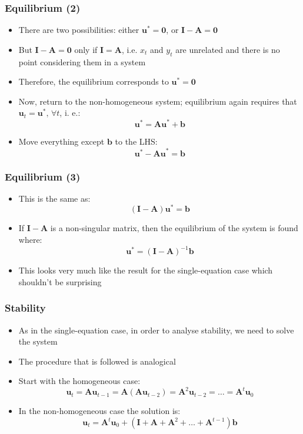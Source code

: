 \documentclass[10pt,usenames,dvipsnames]{beamer}
\theoremstyle{definition}
\begin{document}
\begin{frame}[fragile]
\frametitle{Equilibrium (2)}
\begin{itemize}
	\item There are two possibilities: either $\mathbf{u}^{*} = \mathbf{0}$, or $\mathbf{I-A} = \mathbf{0}$
	\item But $\mathbf{I-A} = \mathbf{0}$ only if $\mathbf{I} = \mathbf{A}$, i.e. $x_{t}$ and $y_{t}$ are unrelated and there is no point considering them in a system
	\item Therefore, the equilibrium corresponds to  $\mathbf{u}^{*} = \mathbf{0}$
	\item Now, return to the non-homogeneous system; equilibrium again requires that $\mathbf{u}_{t} = \mathbf{u}^{*},\, \forall t$, i. e.:
	\[
		\mathbf{u}^{*} = \mathbf{Au}^{*} + \mathbf{b}
	\]
	\item Move everything except $\mathbf{b}$ to the LHS:
	\[
		\mathbf{u}^{*} - \mathbf{Au}^{*} = \mathbf{b}
	\]
\end{itemize}
\end{frame}

\begin{frame}[fragile]
\frametitle{Equilibrium (3)}
\begin{itemize}
	\item This is the same as:
	\[
		(\mathbf{I-A})\mathbf{u}^{*} = \mathbf{b}
	\]
	\item If $\mathbf{I-A}$ is a non-singular matrix, then the equilibrium of the system is found where:
	\[
		\mathbf{u}^{*} = (\mathbf{I-A})^{-1}\mathbf{b}
	\]
	\item This looks very much like the result for the single-equation case which shouldn't be surprising
\end{itemize}
\end{frame}

\begin{frame}[fragile]
\frametitle{Stability}
\begin{itemize}
	\item As in the single-equation case, in order to analyse stability, we need to solve the system
	\item The procedure that is followed is analogical
	\item Start with the homogeneous case:
	\[
		\mathbf{u}_{t} = \mathbf{Au}_{t-1} = \mathbf{A}(\mathbf{Au}_{t-2}) = \mathbf{A}^{2}\mathbf{u}_{t-2} = \ldots = \mathbf{A}^{t}\mathbf{u}_{0}
	\]
	\item In the non-homogeneous case the solution is:
	\[
		\mathbf{u}_{t} = \mathbf{A}^{t}\mathbf{u}_{0} + (\mathbf{I + A} + \mathbf{A}^{2} + \ldots + \mathbf{A}^{t-1})\mathbf{b}
	\]
\end{itemize}
\end{frame}
\end{document}
